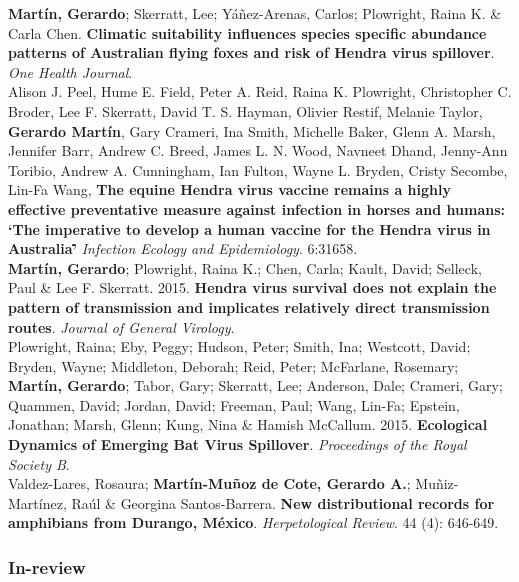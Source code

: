 \documentclass[12pt, a4paper]{article}
\newcommand{\years}[1]{\marginnote{\scriptsize #1}}
\begin{document}
\years{2016} \textbf{Mart\'in, Gerardo}; Skerratt, Lee; Y\'a\~nez-Arenas, Carlos; Plowright, Raina K. \& Carla Chen. \textbf{Climatic suitability influences species specific abundance patterns of Australian flying foxes and risk of Hendra virus spillover}. \emph{One Health Journal}.\\

\years{2016} Alison J. Peel, Hume E. Field, Peter A. Reid, Raina K. Plowright, Christopher C. Broder, Lee F. Skerratt, David T. S. Hayman, Olivier Restif, Melanie Taylor, \textbf{Gerardo Mart\'in}, Gary Crameri, Ina Smith, Michelle Baker, Glenn A. Marsh, Jennifer Barr, Andrew C. Breed, James L. N. Wood, Navneet Dhand, Jenny-Ann Toribio, Andrew A. Cunningham, Ian Fulton, Wayne L. Bryden, Cristy Secombe, Lin-Fa Wang, \textbf{The equine Hendra virus vaccine remains a highly effective preventative measure against infection in horses and humans: \lq The imperative to develop a human vaccine for the Hendra virus in Australia\rq\.} \emph{Infection Ecology and Epidemiology}. {6\bf}:31658.\\

\years{2015} \textbf{Mart\'in, Gerardo}; Plowright, Raina K.; Chen, Carla; Kault, David; Selleck, Paul \& Lee F. Skerratt. 2015. \textbf{Hendra virus survival does not explain the pattern of transmission and implicates relatively direct transmission routes}. \emph{Journal of General Virology}.\\

\years{2015} Plowright, Raina; Eby, Peggy; Hudson, Peter; Smith, Ina; Westcott, David; Bryden, Wayne; Middleton, Deborah; Reid, Peter; McFarlane, Rosemary; \textbf{Mart\'in, Gerardo}; Tabor, Gary; Skerratt, Lee; Anderson, Dale; Crameri, Gary; Quammen, David; Jordan, David; Freeman, Paul; Wang, Lin-Fa; Epstein, Jonathan; Marsh, Glenn; Kung, Nina \& Hamish McCallum. 2015. \textbf{Ecological Dynamics of Emerging Bat Virus Spillover}. \emph{Proceedings of the Royal Society B}.\\

\years{2013} Valdez-Lares, Rosaura; \textbf{Mart\'in-Mu\~noz de Cote, Gerardo A.}; Mu\~niz-Mart\'inez, Ra\'ul \& Georgina Santos-Barrera. \textbf{New distributional records for amphibians from Durango, M\'exico}. \emph{Herpetological Review}. 44 (4): 646-649.\\

\subsubsection*{In-review}
\end{document}
